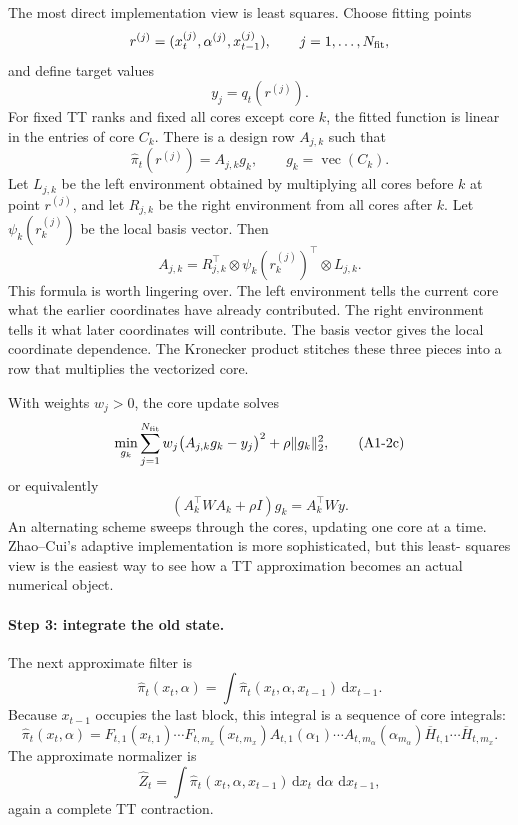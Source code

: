 \documentclass[11pt]{article}
\newcommand{\dd}{\,\mathrm d}
\newcommand{\vecop}{\operatorname{vec}}
\begin{document}
The most direct implementation view is least squares.  Choose fitting points
\[
    r^{(j)}=(x_t^{(j)},\alpha^{(j)},x_{t-1}^{(j)}),
    \qquad j=1,\ldots,N_{\rm fit},
\]
and define target values
\[
    y_j=q_t(r^{(j)}).
\]
For fixed TT ranks and fixed all cores except core \(k\), the fitted function is
linear in the entries of core \(C_k\).  There is a design row \(A_{j,k}\) such
that
\[
    \widehat\pi_t(r^{(j)})=A_{j,k}g_k,
    \qquad g_k=\vecop(C_k).
    \tag{A1-2a}
\]
Let \(L_{j,k}\) be the left environment obtained by multiplying all cores before
\(k\) at point \(r^{(j)}\), and let \(R_{j,k}\) be the right environment from
all cores after \(k\).  Let
\(\psi_k(r_k^{(j)})\) be the local basis vector.  Then
\[
    A_{j,k}
    =
    R_{j,k}^{\top}\otimes \psi_k(r_k^{(j)})^\top\otimes L_{j,k}.
    \tag{A1-2b}
\]
This formula is worth lingering over.  The left environment tells the current
core what the earlier coordinates have already contributed.  The right
environment tells it what later coordinates will contribute.  The basis vector
gives the local coordinate dependence.  The Kronecker product stitches these
three pieces into a row that multiplies the vectorized core.

With weights \(w_j>0\), the core update solves
\[
    \min_{g_k}
    \sum_{j=1}^{N_{\rm fit}}w_j\bigl(A_{j,k}g_k-y_j\bigr)^2
    +\rho\|g_k\|_2^2,
    \tag{A1-2c}
\]
or equivalently
\[
    (A_k^\top W A_k+\rho I)g_k=A_k^\top Wy.
    \tag{A1-2d}
\]
An alternating scheme sweeps through the cores, updating one core at a time.
Zhao--Cui's adaptive implementation is more sophisticated, but this least-
squares view is the easiest way to see how a TT approximation becomes an
actual numerical object.

\paragraph{Step 3: integrate the old state.}
The next approximate filter is
\[
    \widehat\pi_t(x_t,\alpha)
    =
    \int \widehat\pi_t(x_t,\alpha,x_{t-1})\dd x_{t-1}.
    \tag{A1-3}
\]
Because \(x_{t-1}\) occupies the last block, this integral is a sequence of core
integrals:
\[
    \widehat\pi_t(x_t,\alpha)
    =
    F_{t,1}(x_{t,1})\cdots F_{t,m_x}(x_{t,m_x})
    A_{t,1}(\alpha_1)\cdots A_{t,m_\alpha}(\alpha_{m_\alpha})
    \overline H_{t,1}\cdots \overline H_{t,m_x}.
    \tag{A1-4}
\]
The approximate normalizer is
\[
    \widehat Z_t
    =
    \int \widehat\pi_t(x_t,\alpha,x_{t-1})
    \dd x_t\,\dd\alpha\,\dd x_{t-1},
    \tag{A1-5}
\]
again a complete TT contraction.
\end{document}
